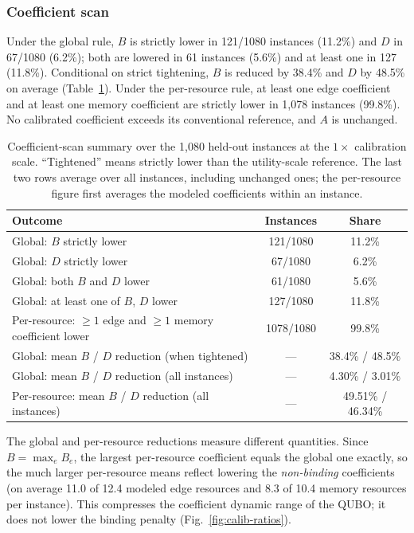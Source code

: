 \documentclass[10pt,a4paper]{article}
\begin{document}
\subsubsection{Coefficient scan}

Under the global rule, $B$ is strictly lower in 121/1080 instances
(11.2\%) and $D$ in 67/1080 (6.2\%); both are lowered in 61 instances
(5.6\%) and at least one in 127 (11.8\%).  Conditional on strict
tightening, $B$ is reduced by 38.4\% and $D$ by 48.5\% on average
(Table~\ref{tab:calib-scan}).  Under the per-resource rule, at least
one edge coefficient and at least one memory coefficient are strictly
lower in 1{,}078 instances (99.8\%).  No calibrated coefficient exceeds
its conventional reference, and $A$ is unchanged.

\begin{table}[H]
  \centering
  \caption{Coefficient-scan summary over the 1{,}080 held-out
    instances at the $1\times$ calibration scale.  ``Tightened'' means
    strictly lower than the utility-scale reference.  The last two rows
    average over all instances, including unchanged ones; the
    per-resource figure first averages the modeled coefficients within
    an instance.}
  \label{tab:calib-scan}
  \begin{tabular}{lcc}
    \toprule
    Outcome & Instances & Share \\
    \midrule
    Global: $B$ strictly lower & 121/1080 & 11.2\% \\
    Global: $D$ strictly lower & 67/1080 & 6.2\% \\
    Global: both $B$ and $D$ lower & 61/1080 & 5.6\% \\
    Global: at least one of $B$, $D$ lower & 127/1080 & 11.8\% \\
    Per-resource: $\ge 1$ edge and $\ge 1$ memory coefficient lower
      & 1078/1080 & 99.8\% \\
    \midrule
    Global: mean $B$ / $D$ reduction (when tightened) & --- & 38.4\% / 48.5\% \\
    Global: mean $B$ / $D$ reduction (all instances) & --- & 4.30\% / 3.01\% \\
    Per-resource: mean $B$ / $D$ reduction (all instances) & --- & 49.51\% / 46.34\% \\
    \bottomrule
  \end{tabular}
\end{table}

The global and per-resource reductions measure different quantities.
Since $B=\max_e B_e$, the largest per-resource coefficient equals the
global one exactly, so the much larger per-resource means reflect
lowering the \emph{non-binding} coefficients (on average 11.0 of 12.4
modeled edge resources and 8.3 of 10.4 memory resources per instance).
This compresses the coefficient dynamic range of the QUBO; it does not
lower the binding penalty (Fig.~\ref{fig:calib-ratios}).
\end{document}
